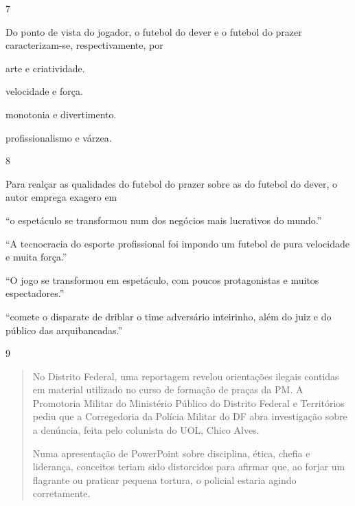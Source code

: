 \num{7}

Do ponto de vista do jogador, o futebol do dever e o futebol do prazer
caracterizam-se, respectivamente, por

\begin{escolha}
\item arte e criatividade.

\item velocidade e força.

\item monotonia e divertimento.

\item profissionalismo e várzea.
\end{escolha}

\num{8}

Para realçar as qualidades do futebol do prazer sobre as do futebol do
dever, o autor emprega exagero em

\begin{escolha}
\item ``o espetáculo se transformou num dos negócios mais lucrativos do
mundo.''

\item ``A tecnocracia do esporte profissional foi impondo um futebol de
pura velocidade e muita força.''

\item ``O jogo se transformou em espetáculo, com poucos protagonistas e
muitos espectadores.''

\item ``comete o disparate de driblar o time adversário inteirinho, além do
juiz e do público das arquibancadas.''
\end{escolha}

\num{9}

\begin{quote}
No Distrito Federal, uma reportagem revelou orientações ilegais contidas
em material utilizado no curso de formação de praças da PM. A Promotoria
Militar do Ministério Público do Distrito Federal e Territórios pediu
que a Corregedoria da Polícia Militar do DF abra investigação sobre a
denúncia, feita pelo colunista do UOL, Chico Alves.

Numa apresentação de PowerPoint sobre disciplina, ética, chefia e
liderança, conceitos teriam sido distorcidos para afirmar que, ao forjar
um flagrante ou praticar pequena tortura, o policial estaria agindo
corretamente.
\end{quote}


